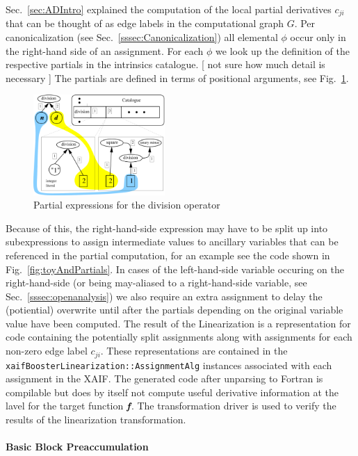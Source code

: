 \documentclass[11pt]{article}
\newcommand{\xaif}{XAIF}
\newcommand{\bmf}{\mbox{\bf\em f}}
\newcommand{\code}[1]{{\small\tt{#1}}}
\newcommand{\refsec}[1]{{Sec.~\ref{#1}}}
\newcommand{\reffig}[1]{{Fig.~\ref{#1}}}
\begin{document}
\refsec{sec:ADIntro} explained the computation of 
the local partial derivatives $c_{ji}$ that can be thought of as edge labels 
in the computational graph $G$. 
Per canonicalization (see \refsec{sssec:Canonicalization}) 
all elemental $\phi$ 
occur only in the right-hand side of an assignment. 
For each $\phi$ we look up the definition of the respective partials in 
the intrinsics catalogue. 
{\color{red} [ not sure  how much detail is necessary ] } 
The partials are defined in terms of positional arguments, see 
\reffig{fig:divExample}. 
\begin{figure}
  \centering \includegraphics[width=5cm]{divIntrinsic}
  \caption{Partial expressions for the division operator} \label{fig:divExample}
\end{figure}

Because of this, 
the right-hand-side expression may have to be split up into 
subexpressions to assign intermediate values to ancillary variables 
that can be referenced in the partial computation, for an example see 
the code shown in \reffig{fig:toyAndPartials}.  
In cases of the left-hand-side variable occuring on the right-hand-side 
(or being may-aliased to a right-hand-side variable, 
see \refsec{sssec:openanalysis}) we also require an extra assignment to 
delay the (potiential) overwrite until after the partials depending on 
the original variable value have been computed.
The result of the Linearization is a representation for 
code containing the potentially split 
assignments along with assignments for each non-zero edge label $c_{ji}$.
These representations are contained in the \code{xaifBoosterLinearization::AssignmentAlg} instances associated with each assignment in the \xaif.
The generated code after unparsing to Fortran 
is compilable but does by itself not compute useful 
derivative information at the lavel for the target function $\bmf$. The 
transformation driver is 
used to verify the results of the linearization transformation.

\paragraph{Basic Block Preaccumulation}\label{sssec:BBPreacc}
\end{document}
